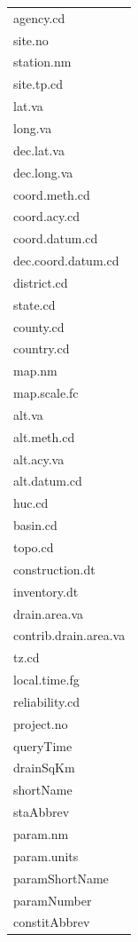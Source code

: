 \documentclass[a4paper,11pt]{article}
\begin{document}
\begin{tabular}{l}
  \hline
  \hline
agency.cd \\ 
  site.no \\ 
  station.nm \\ 
  site.tp.cd \\ 
  lat.va \\ 
  long.va \\ 
  dec.lat.va \\ 
  dec.long.va \\ 
  coord.meth.cd \\ 
  coord.acy.cd \\ 
  coord.datum.cd \\ 
  dec.coord.datum.cd \\ 
  district.cd \\ 
  state.cd \\ 
  county.cd \\ 
  country.cd \\ 
  map.nm \\ 
  map.scale.fc \\ 
  alt.va \\ 
  alt.meth.cd \\ 
  alt.acy.va \\ 
  alt.datum.cd \\ 
  huc.cd \\ 
  basin.cd \\ 
  topo.cd \\ 
  construction.dt \\ 
  inventory.dt \\ 
  drain.area.va \\ 
  contrib.drain.area.va \\ 
  tz.cd \\ 
  local.time.fg \\ 
  reliability.cd \\ 
  project.no \\ 
  queryTime \\ 
  drainSqKm \\ 
  shortName \\ 
  staAbbrev \\ 
  param.nm \\ 
  param.units \\ 
  paramShortName \\ 
  paramNumber \\ 
  constitAbbrev \\ 
   \hline
\end{tabular}
\FloatBarrier
\end{document}
